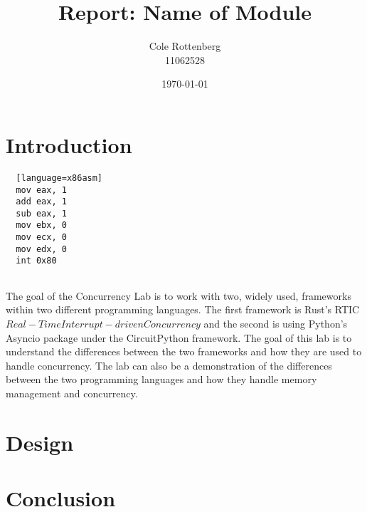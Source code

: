\documentclass{article}
\title{Report: Name of Module}
\author{Cole Rottenberg \\ 11062528}
\date{\today}
\begin{document}
\maketitle

\section*{Introduction}

\begin{lstlisting}
  [language=x86asm]
  mov eax, 1
  add eax, 1
  sub eax, 1
  mov ebx, 0
  mov ecx, 0
  mov edx, 0
  int 0x80
  
\end{lstlisting}

The goal of the Concurrency Lab is to work with two, widely used, frameworks within two different programming languages. The first framework is Rust's RTIC\(Real-Time Interrupt-driven Concurrency\) and the second is using Python's Asyncio package under the CircuitPython framework. The goal of this lab is to understand the differences between the two frameworks and how they are used to handle concurrency. The lab can also be a demonstration of the differences between the two programming languages and how they handle memory management and concurrency.

\section*{Design}


\section*{Conclusion}
\end{document}

